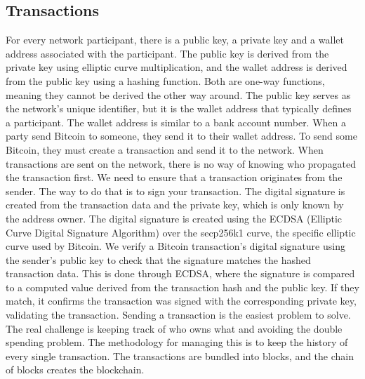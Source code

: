 \subsection{Transactions}
For every network participant, there is a public key, a private key and a wallet address associated with the participant.
The public key is derived from the private key using elliptic curve multiplication, and the wallet address is derived from the public key using a hashing function.
Both are one-way functions, meaning they cannot be derived the other way around.
The public key serves as the network's unique identifier, but it is the wallet address that typically defines a participant.
The wallet address is similar to a bank account number. When a party send Bitcoin to someone, they send it to their wallet address.
To send some Bitcoin, they must create a transaction and send it to the network.
When transactions are sent on the network, there is no way of knowing who propagated the transaction first.
We need to ensure that a transaction originates from the sender. The way to do that is to sign your transaction. The digital signature is created from the transaction data and the private key, which is only known by the address owner.
The digital signature is created using the ECDSA (Elliptic Curve Digital Signature Algorithm) over the secp256k1 curve, the specific elliptic curve used by Bitcoin.
We verify a Bitcoin transaction's digital signature using the sender's public key to check that the signature matches the hashed transaction data.
This is done through ECDSA, where the signature is compared to a computed value derived from the transaction hash and the public key.
If they match, it confirms the transaction was signed with the corresponding private key, validating the transaction.
Sending a transaction is the easiest problem to solve. The real challenge is keeping track of who owns what and avoiding the double spending problem.
The methodology for managing this is to keep the history of every single transaction. The transactions are bundled into blocks, and the chain of blocks creates the blockchain. \cite{MB17}

